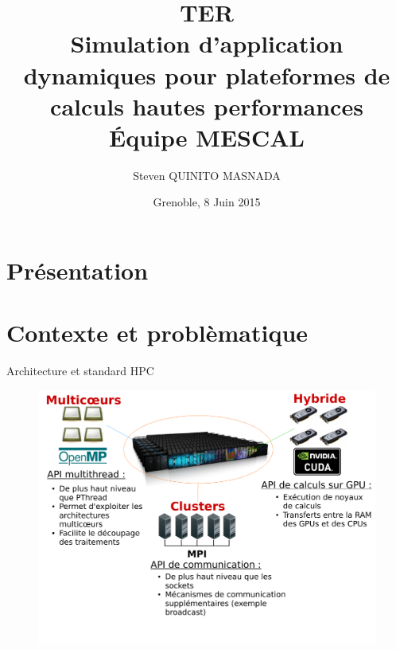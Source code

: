 \documentclass[11pt,xcolor=dvipsnames,presentation]{beamer}
\author{Steven QUINITO MASNADA}
\date{Grenoble, 8 Juin 2015}
\title{\textbf{TER} \\ Simulation d'application dynamiques pour plateformes de calculs hautes performances \bigskip\\ \large Équipe MESCAL}
\begin{document}
\maketitle


\section{Présentation}
\label{sec-1}
\section{Contexte et problèmatique}
\label{sec-2}
\begin{frame}[label=sec-2-1]{Architecture et standard HPC}
\begin{figure}[tbh]
\centering
\vspace{-1.5mm}
\includegraphics[width=\linewidth]{./Slides/Archi.pdf}
\end{figure}
\end{frame}
\end{document}
